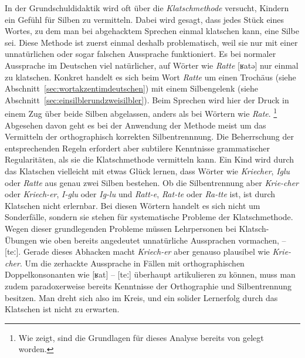 
In der Grundschuldidaktik wird oft über die \textit{Klatschmethode} versucht, Kindern ein Gefühl für Silben zu vermitteln.
Dabei wird gesagt, dass jedes Stück eines Wortes, zu dem man bei abgehacktem Sprechen einmal klatschen kann, eine Silbe sei.
Diese Methode ist zuerst einmal deshalb problematisch, weil sie nur mit einer unnatürlichen oder sogar falschen Aussprache funktioniert.
Es bei normaler Aussprache im Deutschen viel natürlicher, auf Wörter wie \textit{Ratte} [ʁatə] nur einmal zu klatschen.
Konkret handelt es sich beim Wort \textit{Ratte} um einen Trochäus (siehe Abschnitt~\ref{sec:wortakzentimdeutschen}) mit einem Silbengelenk (siehe Abschnitt~\ref{sec:einsilblerundzweisilbler}).
Beim Sprechen wird hier der Druck in einem Zug über beide Silben abgelassen, anders als bei Wörtern wie \textit{Rate}.%
\footnote{Wie \citet[15--16]{Maas2002} zeigt, sind die Grundlagen für dieses Analyse bereits von \citet{Sievers1876} gelegt worden.}
Abgesehen davon geht es bei der Anwendung der Methode meist um das Vermitteln der orthographisch korrekten Silbentrennnung.
Die Beherrschung der entsprechenden Regeln erfordert aber subtilere Kenntnisse grammatischer Regularitäten, als sie die Klatschmethode vermitteln kann.
Ein Kind wird durch das Klatschen vielleicht mit etwas Glück lernen, dass Wörter wie \textit{Kriecher}, \textit{Iglu} oder \textit{Ratte} aus genau zwei Silben bestehen.
Ob die Silbentrennung aber \textit{Krie-cher} oder \textit{Kriech-er}, \textit{I-glu} oder \textit{Ig-lu} und \textit{Ratt-e}, \textit{Rat-te} oder \textit{Ra-tte} ist, ist durch Klatschen nicht erlernbar.
Bei diesen Wörtern handelt es sich nicht um Sonderfälle, sondern sie stehen für systematische Probleme der Klatschmethode.
Wegen dieser grundlegenden Probleme müssen Lehrpersonen bei Klatsch-Übungen wie oben bereits angedeutet unnatürliche Aussprachen vormachen, \zB [ʁat] -- [teː].
Gerade dieses Abhacken macht \textit{Kriech-er} aber genauso plausibel wie \textit{Krie-cher}.
Um die zerhackte Aussprache in Fällen mit orthographischen Doppelkonsonanten wie [ʁat] -- [teː] überhaupt artikulieren zu können, muss man zudem paradoxerweise bereits Kenntnisse der Orthographie und Silbentrennung besitzen.
Man dreht sich also im Kreis, und ein solider Lernerfolg durch das Klatschen ist nicht zu erwarten.

